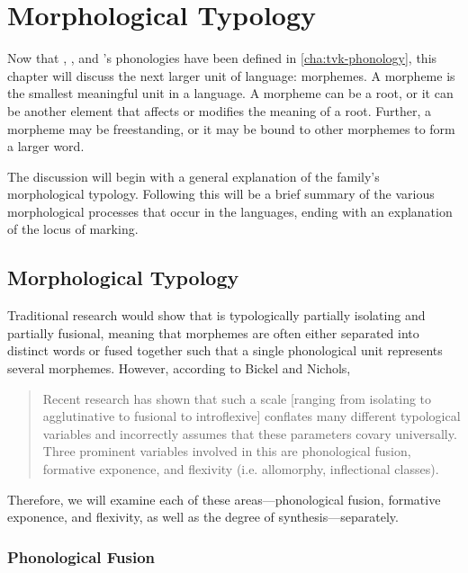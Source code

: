 \chapter{Morphological Typology}
\label{cha:tvk-morphological-typology}

Now that \langtvk, \langank, and \langrdk's phonologies have been defined in \autoref{cha:tvk-phonology}, this chapter will discuss the next larger unit of language: morphemes. A morpheme is the smallest meaningful unit in a language. A morpheme can be a root, or it can be another element that affects or modifies the meaning of a root. Further, a morpheme may be freestanding, or it may be bound to other morphemes to form a larger word.

The discussion will begin with a general explanation of the \langtvk{} family's morphological typology. Following this will be a brief summary of the various morphological processes that occur in the languages, ending with an explanation of the locus of marking.

\section{Morphological Typology}
\label{sec:tvk-typology}

Traditional research would show that \langtvk{} is typologically partially isolating and partially fusional, meaning that morphemes are often either separated into distinct words or fused together such that a single phonological unit represents several morphemes. However, according to Bickel and Nichols, \blockquote{Recent research has shown that such a scale [ranging from isolating to agglutinative to fusional to introflexive] conflates many different typological variables and incorrectly assumes that these parameters covary universally\autocite{Plank-1999,Bickel-and-Nichols-2005}. Three prominent variables involved in this are phonological fusion, formative exponence, and flexivity (i.e. allomorphy, inflectional classes).\autocite{wals-20}} Therefore, we will examine each of these areas---phonological fusion, formative exponence, and flexivity, as well as the degree of synthesis---separately.

\subsection{Phonological Fusion}
\label{subsec:tvk-fusion}

